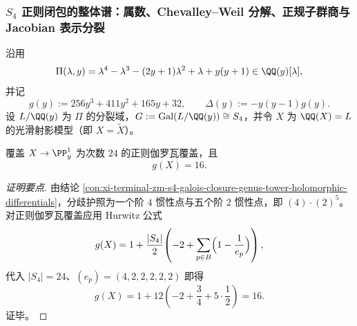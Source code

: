 \subsubsection{\texorpdfstring{$S_4$}{S4} 正则闭包的整体谱：属数、Chevalley--Weil 分解、正规子群商与 Jacobian 表示分裂}\label{subsubsec:xi-s4-regular-closure-global-spectrum}
沿用
\[
\Pi(\lambda,y)=\lambda^{4}-\lambda^{3}-(2y+1)\lambda^{2}+\lambda+y(y+1)\in\QQ(y)[\lambda],
\]
并记
\[
g(y):=256y^{3}+411y^{2}+165y+32,\qquad
\Delta(y):=-y(y-1)g(y).
\]
设 \(L/\QQ(y)\) 为 \(\Pi\) 的分裂域，\(G:=\mathrm{Gal}(L/\QQ(y))\cong S_4\)，并令 \(X\) 为 \(\QQ(X)=L\) 的光滑射影模型（即 \(X=\widetilde X\)）。

\begin{conclusion}\label{con:xi-terminal-zm-s4-regular-closure-exact-genus-16}
覆盖 \(X\to\PP^1_y\) 为次数 \(24\) 的正则伽罗瓦覆盖，且
\[
g(X)=16.
\]
\end{conclusion}
\begin{proof}[证明要点]
由结论 \ref{con:xi-terminal-zm-s4-galois-closure-genus-tower-holomorphic-differentials}，分歧护照为一个阶 \(4\) 惯性点与五个阶 \(2\) 惯性点，即 \((4)\cdot(2)^5\)。
对正则伽罗瓦覆盖应用 Hurwitz 公式
\[
g(X)=1+\frac{|S_4|}{2}\!\left(-2+\sum_{p\in B}\Bigl(1-\frac1{e_p}\Bigr)\right),
\]
代入 \(|S_4|=24\)、\((e_p)=(4,2,2,2,2,2)\) 即得
\[
g(X)=1+12\!\left(-2+\frac34+5\cdot\frac12\right)=16.
\]
证毕。
\end{proof}

